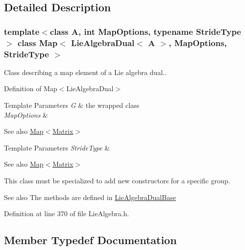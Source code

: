 \subsection{Detailed Description}
\subsubsection*{template$<$class A, int Map\+Options, typename Stride\+Type$>$\newline
class Map$<$ Lie\+Algebra\+Dual$<$ A $>$, Map\+Options, Stride\+Type $>$}

Class describing a map element of a Lie algebra dual.. 

Definition of Map$<$\+Lie\+Algebra\+Dual$>$


\begin{DoxyTemplParams}{Template Parameters}
{\em G} & the wrapped class \\
\hline
{\em Map\+Options} & \\
\hline
\end{DoxyTemplParams}
\begin{DoxySeeAlso}{See also}
\hyperlink{class_map_3_01_lie_algebra_dual_3_01_a_01_4_00_01_map_options_00_01_stride_type_01_4_a343da7ed6d4069324cd174c8fa51a43f}{Map$<$\+Matrix$>$} 
\end{DoxySeeAlso}

\begin{DoxyTemplParams}{Template Parameters}
{\em Stride\+Type} & \\
\hline
\end{DoxyTemplParams}
\begin{DoxySeeAlso}{See also}
\hyperlink{class_map_3_01_lie_algebra_dual_3_01_a_01_4_00_01_map_options_00_01_stride_type_01_4_a343da7ed6d4069324cd174c8fa51a43f}{Map$<$\+Matrix$>$}
\end{DoxySeeAlso}
This class must be specialized to add new constructors for a specific group.

\begin{DoxySeeAlso}{See also}
The methods are defined in \hyperlink{class_lie_algebra_dual_base}{Lie\+Algebra\+Dual\+Base} 
\end{DoxySeeAlso}


Definition at line 370 of file Lie\+Algebra.\+h.



\subsection{Member Typedef Documentation}
\hypertarget{class_map_3_01_lie_algebra_dual_3_01_a_01_4_00_01_map_options_00_01_stride_type_01_4_ad1209b4cd7e7831c3556bae3a466822b}{}\label{class_map_3_01_lie_algebra_dual_3_01_a_01_4_00_01_map_options_00_01_stride_type_01_4_ad1209b4cd7e7831c3556bae3a466822b} 
